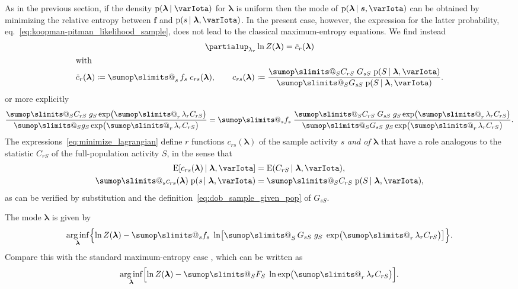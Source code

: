 \documentclass[\ifafour a4paper,12pt,\else a5paper,10pt,\fi%
onecolumn,oneside,article,%
british%
]{memoir}
\makeatletter
\theoremstyle{remark}
\theoremstyle{innote}
\def\sum{\DOTSI\sumop\slimits@}
\newcommand*{\citep}{\parencites}
\newcommand*{\de}{\partialup}%
\newcommand*{\defd}{\coloneqq}
\newcommand*{\pf}{\mathrm{p}}%
\newcommand*{\E}{\mathrm{E}}
\renewcommand*{\|}{\nonscript\,\vert\nonscript\;\mathopen{}}
\newcommand*{\eqn}{eq.}%
\newcommand*{\tsum}{\mathop{\textstyle\sum}\nolimits}
\newcommand*{\widebar}[1]{{\mkern1.5mu\skew{2}\overline{\mkern-1.5mu#1\mkern-1.5mu}\mkern 1.5mu}}
\DeclareMathOperator*{\arginf}{arg\,inf}
\newcommand*{\yS}{S}
\newcommand*{\ys}{s}
\newcommand*{\yst}{\bm{\ys}}
\newcommand*{\yll}{\lambda}
\newcommand*{\yl}{\bm{\lambda}}
\newcommand*{\yg}{g}
\newcommand*{\yI}{\varIota}
\newcommand*{\yf}{\bm{f}}
\newcommand*{\yccs}{\widebar{c}}
\makeatother
\begin{document}
As in the previous section, if the density $\pf(\yl \| \yI)$ for $\yl$ is
uniform then the mode of $\pf(\yl \| \yst, \yI)$ can be obtained by
minimizing the relative entropy between $\yf$ and $\pf(\ys \| \yl, \yI)$.
In the present case, however, the expression for the latter probability,
\eqn~\eqref{eq:koopman-pitman_likelihood_sample}, does not lead to the
classical maximum-entropy equations. We find instead
\begin{subequations}
  \label{eq:minimize_lagrangian}
  \begin{gather}
    \de_{\yll_{r}}\ln Z(\yl) = \yccs_{r}(\yl)
    \\
    \shortintertext{with}
   \yccs_{r}(\yl) \defd
   \tsum_{\ys} f_{\ys}\; c_{r\ys}(\yl),
   \qquad
    c_{r\ys}(\yl) \defd \frac{
      \sum_{\yS} C_{r\yS}\; G_{\ys\yS}\;\pf(\yS \| \yl, \yI)
    }{
      \sum_{\yS} G_{\ys\yS}\;\pf(\yS \| \yl, \yI)
    }.
  \end{gather}
\end{subequations}
or more explicitly
\begin{equation}
  \label{eq:explicit_eqn_lambda_sample}
  \frac{\sum_{\yS} C_{r\yS}\;\yg_{\yS}
    \exp\bigl( \tsum_{r} \yll_{r} C_{r\yS} \bigr)}{
    \sum_{\yS} \yg_{\yS}
    \exp\bigl( \tsum_{r} \yll_{r} C_{r\yS} \bigr)
  }
  =
  \sum_{\ys} f_{\ys}\;
  \frac{
    \sum_{\yS} C_{r\yS}\; G_{\ys\yS}\;\yg_{\yS}
    \exp\bigl( \tsum_{r} \yll_{r} C_{r\yS} \bigr)
  }{
    \sum_{\yS} G_{\ys\yS}\;\yg_{\yS}
    \exp\bigl( \tsum_{r} \yll_{r} C_{r\yS} \bigr)
  }.
\end{equation}
The expressions~\eqref{eq:minimize_lagrangian} define $r$ functions
$c_{r\ys}(\yl)$ of the sample activity $\ys$ \emph{and of $\yl$} that have
a role analogous to the statistic $C_{r\yS}$ of the full-population
activity $\yS$, in the sense that
\begin{equation}
  \label{eq:statistics_for_sample}
  \begin{split}
  \E[c_{r\ys}(\yl) \| \yl, \yI]
  &=  \E(C_{r\yS} \| \yl, \yI),
  \\
  \sum_{\ys} c_{r\ys}(\yl)\; \pf(\ys \| \yl, \yI)
 &= \sum_{\yS} C_{r\yS}\; \pf(\yS \| \yl, \yI),
\end{split}
\end{equation}
as can be verified by substitution and the
definition~\eqref{eq:dob_sample_given_pop} of $G_{\ys\yS}$.

The mode $\yl$ is given by
\begin{equation}
  \arginf_{\yl}\Bigl\{ 
  \ln Z(\yl) - \sum_{\ys} f_{\ys}\;
  \ln\bigl[\tsum_{\yS}
  G_{\ys\yS}\;\yg_{\yS}\;
  \exp\bigl( \tsum_{r} \yll_{r} C_{r\yS} \bigr)\bigr]
  \Bigr\}.
\end{equation}
Compare this with the standard maximum-entropy case \citep{meadetal1984},
which can be written as
\begin{equation}
  \arginf_{\yl}\Bigl[
  \ln Z(\yl) - \sum_{\yS} F_{\yS}\;
  \ln \exp\bigl( \tsum_{r} \yll_{r} C_{r\yS} \bigr)
  \Bigr].
\end{equation}
\end{document}
